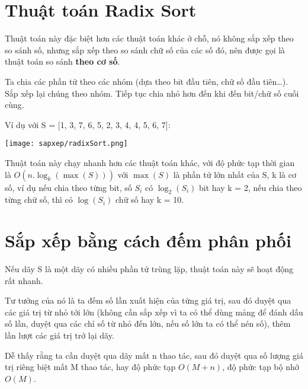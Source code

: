 \section{Thuật toán Radix Sort}
Thuật toán này đặc biệt hơn các thuật toán khác ở chỗ, nó không sắp xếp theo so sánh số, nhưng sắp xếp theo so sánh chữ số của các số đó, nên được gọi là thuật toán so sánh \textbf{theo cơ số}.

Ta chia các phần tử theo các nhóm (dựa theo bit đầu tiên, chữ số đầu tiên\dots). Sắp xếp lại chúng theo nhóm. Tiếp tục chia nhỏ hơn đến khi đến bit/chữ số cuối cùng.

Ví dụ với S = [1, 3, 7, 6, 5, 2, 3, 4, 4, 5, 6, 7]:

\texttt{[image: sapxep/radixSort.png]}

Thuật toán này chạy nhanh hơn các thuật toán khác, với độ phức tạp thời gian là $O(n.\log_k(\max(S)))$ với $\max(S)$ là phần tử lớn nhất của S, k là cơ số, ví dụ nếu chia theo từng bit, số $S_i$ có $\log_2(S_i)$ bit hay k = 2, nếu chia theo từng chữ số, thì có $\log(S_i)$ chữ số hay k = 10.

\section{Sắp xếp bằng cách đếm phân phối}
Nếu dãy S là một dãy có nhiều phần tử trùng lặp, thuật toán này sẽ hoạt động rất nhanh.

Tư tưởng của nó là ta đếm số lần xuất hiện của từng giá trị, sau đó duyệt qua các giá trị từ nhỏ tới lớn (không cần sắp xếp vì ta có thể dùng mảng để đánh dấu số lần, duyệt qua các chỉ số từ nhỏ đến lớn, nếu số lớn ta có thể nén số), thêm lần lượt các giá trị trở lại dãy.

Dễ thấy rằng ta cần duyệt qua dãy mất n thao tác, sau đó duyệt qua số lượng giá trị riêng biệt mất M thao tác, hay độ phức tạp $O(M + n)$, độ phức tạp bộ nhớ $O(M)$.